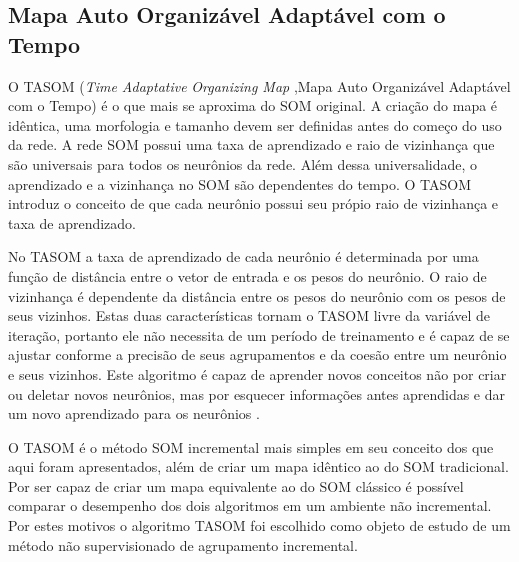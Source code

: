 \subsection{Mapa Auto Organizável Adaptável com o Tempo}
O TASOM (\textit{Time Adaptative} \textit{Organizing Map} ,Mapa Auto Organizável Adaptável com o Tempo) é o que mais se aproxima do SOM original. A criação do mapa é idêntica, uma morfologia e tamanho devem ser definidas antes do começo do uso da rede. A rede SOM possui uma taxa de aprendizado e raio de vizinhança que são universais para todos os neurônios da rede. Além dessa universalidade, o aprendizado e a vizinhança no SOM são dependentes do tempo. O TASOM introduz o conceito de que cada neurônio possui seu própio raio de vizinhança e taxa de aprendizado. 

No TASOM a taxa de aprendizado de cada neurônio é determinada por uma função de distância entre o vetor de entrada e os pesos do neurônio. O raio de vizinhança é dependente da distância entre os pesos do neurônio com os pesos de seus vizinhos. Estas duas características tornam o TASOM livre da variável de iteração, portanto ele não necessita de um período de treinamento e é capaz de se ajustar conforme a precisão de seus agrupamentos e da coesão entre um neurônio e seus vizinhos. Este algoritmo é capaz de aprender novos conceitos não por criar ou deletar novos neurônios, mas por esquecer informações antes aprendidas e dar um novo aprendizado para os neurônios \cite{tasom2001}.

O TASOM é o método SOM incremental mais simples em seu conceito dos que aqui foram apresentados, além de criar um mapa idêntico ao do SOM tradicional. Por ser capaz de criar um mapa equivalente ao do SOM clássico é possível comparar o desempenho dos dois algoritmos em um ambiente não incremental. Por estes motivos o algoritmo TASOM foi escolhido como objeto de estudo de um método não supervisionado de agrupamento incremental.  



 

 










